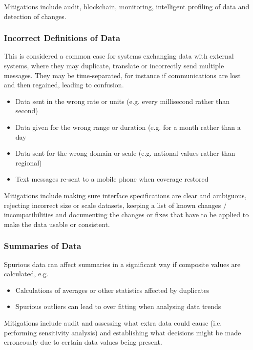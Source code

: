 Mitigations include audit, blockchain, monitoring, intelligent profiling of data and detection of changes.

\subsubsection{Incorrect Definitions of Data}
This is considered a common case for systems exchanging data with external systems, where they may duplicate, translate or incorrectly send multiple messages. They may be time-separated, for instance if communications are lost and then regained, leading to confusion.
\begin{itemize}
    \item Data sent in the wrong rate or units (e.g. every millisecond rather than second)
    \item Data given for the wrong range or duration (e.g. for a month rather than a day
    \item Data sent for the wrong domain or scale (e.g. national values rather than regional)
    \item Text messages re-sent to a mobile phone when coverage restored
\end{itemize}

Mitigations include making sure interface specifications are clear and ambiguous, rejecting incorrect size or scale \glspl{dataset}, keeping a list of known changes / incompatibilities and documenting the changes or fixes that have to be applied to make the data usable or consistent.

\subsubsection{Summaries of Data}
Spurious data can affect summaries in a significant way if composite values are calculated, e.g.
\begin{itemize}
    \item Calculations of averages or other statistics affected by duplicates
    \item Spurious outliers can lead to over fitting when analysing data trends
\end{itemize}

Mitigations include audit and assessing what extra data could cause (i.e. performing sensitivity analysis) and establishing what decisions might be made erroneously due to certain data values being present.	

